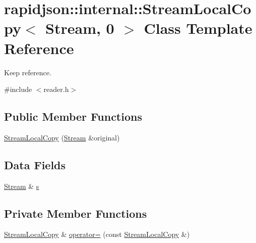 \hypertarget{classrapidjson_1_1internal_1_1_stream_local_copy_3_01_stream_00_010_01_4}{}\section{rapidjson\+::internal\+::Stream\+Local\+Copy$<$ Stream, 0 $>$ Class Template Reference}
\label{classrapidjson_1_1internal_1_1_stream_local_copy_3_01_stream_00_010_01_4}


Keep reference.  




{\ttfamily \#include $<$reader.\+h$>$}

\subsection*{Public Member Functions}
\begin{DoxyCompactItemize}
\item 
\mbox{\hyperlink{classrapidjson_1_1internal_1_1_stream_local_copy_3_01_stream_00_010_01_4_aed4e6505b258c78f869c200e2f60388b}{Stream\+Local\+Copy}} (\mbox{\hyperlink{classrapidjson_1_1_stream}{Stream}} \&original)
\end{DoxyCompactItemize}
\subsection*{Data Fields}
\begin{DoxyCompactItemize}
\item 
\mbox{\hyperlink{classrapidjson_1_1_stream}{Stream}} \& \mbox{\hyperlink{classrapidjson_1_1internal_1_1_stream_local_copy_3_01_stream_00_010_01_4_ac8d90f9a762431d66eb4bb18d5d2f6b4}{s}}
\end{DoxyCompactItemize}
\subsection*{Private Member Functions}
\begin{DoxyCompactItemize}
\item 
\mbox{\hyperlink{classrapidjson_1_1internal_1_1_stream_local_copy}{Stream\+Local\+Copy}} \& \mbox{\hyperlink{classrapidjson_1_1internal_1_1_stream_local_copy_3_01_stream_00_010_01_4_a37cdd0351d00b5d6b1568bc4b043f380}{operator=}} (const \mbox{\hyperlink{classrapidjson_1_1internal_1_1_stream_local_copy}{Stream\+Local\+Copy}} \&)
\end{DoxyCompactItemize}


